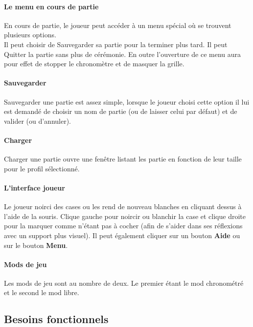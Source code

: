 \documentclass[11pt]{article}
\begin{document}
\paragraph{Le menu en cours de partie}

En cours de partie, le joueur peut accéder à un menu spécial où se trouvent plusieurs options.\\
Il peut choisir de Sauvegarder sa partie pour la terminer plus tard. Il peut Quitter la partie sans plus de cérémonie.
En outre l'ouverture de ce menu aura pour effet de stopper le chronomètre et de masquer la grille.

\paragraph{Sauvegarder}
Sauvegarder une partie est assez simple, lorsque le joueur choisi cette option il lui est demandé de choisir un nom de
partie (ou de laisser celui par défaut) et de valider (ou d'annuler).

\paragraph{Charger}
Charger une partie ouvre une fenêtre listant les partie en fonction de leur taille pour le profil sélectionné.

\paragraph{L'interface joueur}
Le joueur noirci des cases ou les rend de nouveau blanches en cliquant dessus à l'aide de la souris. Clique gauche pour
noircir ou blanchir la case et clique droite pour la marquer comme n'étant pas à cocher (afin de s'aider dans ses
réflexions avec un support plus visuel). Il peut également cliquer sur un bouton \textbf{Aide} ou sur le bouton \textbf{Menu}.

\paragraph{Mods de jeu}
Les mods de jeu sont au nombre de deux. Le premier étant le mod chronométré et le second le mod libre.



\subsection{Besoins fonctionnels}
\end{document}
